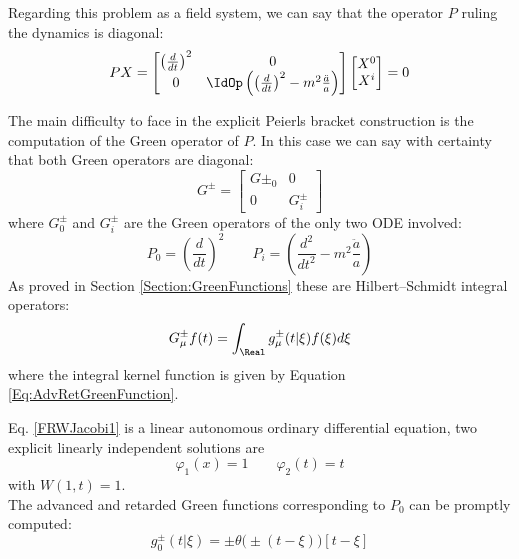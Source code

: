 \documentclass[Main]{subfiles}
\begin{document}
			Regarding this problem as a field system, we can say that the operator $P$ ruling the dynamics is diagonal:
			\begin{displaymath}
				P X =
				 \begin{bmatrix}  
				 \left(\frac{d}{dt}\right)^2 & 0 \\
				 0 & \IdOp \left( \left(\frac{d}{dt}\right)^2 - m^2 \frac{\ddot{a}}{a} \right)
				 \end{bmatrix}
				 \begin{bmatrix} X^0 \\ X^i  \end{bmatrix}
				 = 0
			\end{displaymath}
			
			The main difficulty to face in the explicit Peierls bracket construction is the computation of the Green operator of $P$.
			In this case we can say with certainty that both Green operators are diagonal:
			\begin{displaymath}
				G^\pm =
				 \begin{bmatrix}  
				 G\pm_0 & 0 \\
				 0 & G^\pm_i
				 \end{bmatrix}
			\end{displaymath}		
			where $G^\pm_0$ and $G^\pm_i$ are the Green operators of the only two ODE involved:
			\begin{displaymath}
				P_0 = \left(\frac{d}{dt}\right)^2 \qquad P_i=\left( \frac{d^2}{dt^2} - m^2 \frac{\ddot{a}}{a} \right)
			\end{displaymath}
			As proved in Section \ref{Section:GreenFunctions} these are  Hilbert–Schmidt integral operators:
			\begin{displaymath}
				G^\pm_\mu f(t) = \int_\Real g^\pm_\mu( t \vert \xi ) f(\xi) d\xi
			\end{displaymath}
			where the integral kernel function is given by  Equation \ref{Eq:AdvRetGreenFunction}.
			
			Eq. \ref{FRWJacobi1} is a linear autonomous ordinary differential equation, two explicit linearly independent solutions are 
			\begin{displaymath}
				\varphi_1(x)=1 \qquad \varphi_2(t)=t
			\end{displaymath} 
			with $W(1,t)=1$. \\
			The advanced and retarded Green functions corresponding to $P_0$ can be promptly computed:
			\begin{equation}\label{SimpleGreenFunction}
				g^\pm_0(t \vert \xi) = \pm \theta\big(\pm(t-\xi)\big) \left[ t -\xi\right]
			\end{equation}
			
\end{document}
